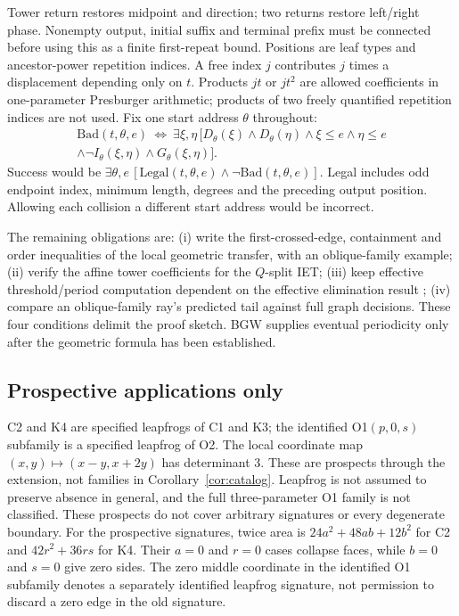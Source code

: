 \documentclass[11pt]{amsart}
\theoremstyle{definition}\newtheorem{definition}{Definition}
\begin{document}
Tower return restores midpoint and direction; two returns restore
left/right phase. Nonempty output, initial suffix and terminal prefix
must be connected before using this as a finite first-repeat bound.
Positions are leaf types and ancestor-power repetition indices.
A free index $j$ contributes $j$ times a displacement depending only
on $t$. Products $jt$ or $jt^2$ are allowed coefficients in one-parameter
Presburger arithmetic; products of two freely quantified repetition
indices are not used. Fix one start address $\theta$ throughout:
\[
\begin{split}
\mathrm{Bad}(t,\theta,e)\ \Longleftrightarrow\
\exists\xi,\eta\,[D_\theta(\xi)\wedge D_\theta(\eta)
\wedge\xi\le e\wedge\eta\le e\\
\wedge\neg I_\theta(\xi,\eta)\wedge G_\theta(\xi,\eta)].
\end{split}
\]
Success would be $\exists\theta,e\,[\mathrm{Legal}(t,\theta,e)
\wedge\neg\mathrm{Bad}(t,\theta,e)]$. Legal includes odd endpoint index,
minimum length, degrees and the preceding output position. Allowing
each collision a different start address would be incorrect.

The remaining obligations are: (i) write the first-crossed-edge,
containment and order inequalities of the local geometric transfer, with an
oblique-family example; (ii) verify the affine tower coefficients
for the $Q$-split IET; (iii) keep effective threshold/period computation
dependent on the effective elimination result \cite{QE}; (iv) compare an oblique-family ray's predicted
tail against full graph decisions. These four conditions delimit the proof sketch.
BGW supplies eventual periodicity only after the geometric formula
has been established.

\subsection{Prospective applications only}
C2 and K4 are specified leapfrogs of C1 and K3; the identified O1$(p,0,s)$
subfamily is a specified leapfrog of O2. The local coordinate map
$(x,y)\mapsto(x-y,x+2y)$ has determinant 3. These are prospects through
the extension, not families in Corollary~\ref{cor:catalog}. Leapfrog
is not assumed to preserve absence in general, and the full
three-parameter O1 family is not classified. These prospects do not
cover arbitrary signatures or every degenerate boundary. For the prospective signatures, twice area is $24a^2+48ab+12b^2$ for C2 and $42r^2+36rs$ for K4. Their $a=0$ and $r=0$ cases collapse faces, while $b=0$ and $s=0$ give zero sides. The zero middle coordinate in the identified O1 subfamily denotes a separately identified leapfrog signature, not permission to discard a zero edge in the old signature.
\end{document}

